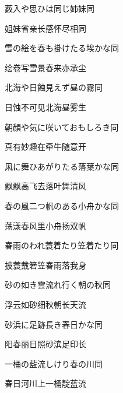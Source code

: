 \begin{haiku}
    {\FH 薮入や思ひは同じ姉妹}\hfill{\FH 同}

    {\FK 姐妹省亲长感怀尽相同}
\end{haiku}

\begin{haiku}
    {\FH 雪の絵を春も掛けたる埃かな}\hfill{\FH 同}

    {\FK 绘卷写雪景春来亦承尘}
\end{haiku}

\begin{haiku}
    {\FH 北海や日蝕見えず昼の霧}\hfill{\FH 同}

    {\FK 日蚀不可见北海昼雾生}
\end{haiku}

\begin{haiku}
    {\FH 朝顔や気に咲いておもしろき}\hfill{\FH 同}

    {\FK 真有妙趣在牵牛随意开}
\end{haiku}

\begin{haiku}
    {\FH 凩に舞ひあがりたる落葉かな}\hfill{\FH 同}

    {\FK 飘飘高飞去落叶舞清风}
\end{haiku}

\begin{haiku}
    {\FH 春の風二つ帆のある小舟かな}\hfill{\FH 同}

    {\FK 荡漾春风里小舟扬双帆}
\end{haiku}

\begin{haiku}
    {\FH 春雨のわれ蓑着たり笠着たり}\hfill{\FH 同}

    {\FK 披蓑戴箬笠春雨落我身}
\end{haiku}

\begin{haiku}
    {\FH 砂の如き雲流れ行く朝の秋}\hfill{\FH 同}

    {\FK 浮云如砂细秋朝长天流}
\end{haiku}

\begin{haiku}
    {\FH 砂浜に足跡長き春日かな}\hfill{\FH 同}

    {\FK 阳春丽日照砂滨足印长}
\end{haiku}

\begin{haiku}
    {\FH 一桶の藍流しけり春の川}\hfill{\FH 同}

    {\FK 春日河川上一桶靛蓝流}
\end{haiku}

